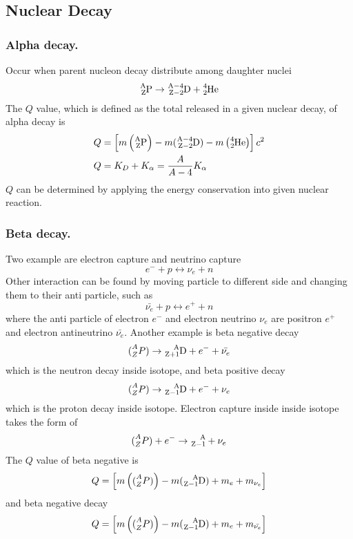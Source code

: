 \documentclass[../../../main.tex]{subfiles}
\begin{document}
\subsection*{Nuclear Decay}

\subsubsection*{Alpha decay.} Occur when parent nucleon decay distribute among daughter nuclei 
\begin{equation*}
    \ce{^A_ZP}\rightarrow\ce{^{A-4}_{Z-2}D}+\ce{^4_2He}
\end{equation*}
The $Q$ value, which is defined as the total released in a given nuclear decay, of alpha decay is 
\begin{align*}
    Q&=\left[m\left(\ce{^A_ZP}\right)-m(\ce{^{A-4}_{Z-2}D})-m\left(\ce{^4_2He}\right)\right]c^2\\
    Q&=K_D+K_\alpha=\frac{A}{A-4}K_\alpha
\end{align*}
$Q$ can be determined by applying the energy conservation into given nuclear reaction. 

\subsubsection*{Beta decay.} Two example are electron capture and neutrino capture 
\begin{equation*}
    e^-+p\leftrightarrow \nu_e+n
\end{equation*} 
Other interaction can be found by moving particle to different side and changing them to their anti particle, such as 
\begin{equation*}
    \bar{\nu_e}+p\leftrightarrow e^++n
\end{equation*}
where the anti particle of electron $e^-$ and electron neutrino $\nu_e$ are positron $e^+$ and electron antineutrino $\bar{\nu_e}$. Another example is beta negative decay
\begin{equation*}
    \ce(^A_ZP)\rightarrow\ce{^A_{Z+1}D}+e^-+\bar{\nu_e}
\end{equation*} 
which is the neutron decay inside isotope, and beta positive decay
\begin{equation*}
    \ce(^A_ZP)\rightarrow\ce{^A_{Z-1}D}+e^-+{\nu_e}
\end{equation*}
which is the proton decay inside isotope. Electron capture inside inside isotope takes the form of 
\begin{equation*}
    \ce(^A_ZP)+e^-\rightarrow \ce{^A_{Z-1}}+\nu_e
\end{equation*}
The $Q$ value of beta negative is 
\begin{equation*}
    Q=\left[m\left(\ce(^A_ZP)\right)-m(\ce{^A_{Z-1}D})+m_e+m_{\nu_e}\right]
\end{equation*}
and beta negative decay 
\begin{equation*}
    Q=\left[m\left(\ce(^A_ZP)\right)-m(\ce{^A_{Z-1}D})+m_e+m_{\bar{\nu_e}}\right]
\end{equation*}
\end{document}
